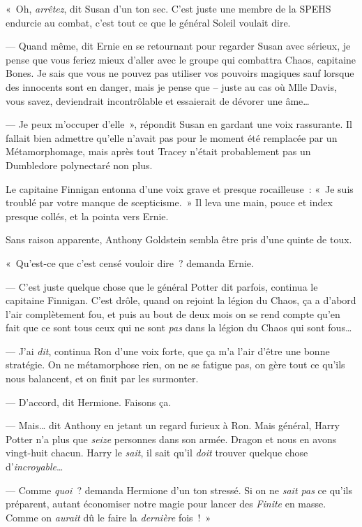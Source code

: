 «~Oh, \emph{arrêtez}, dit Susan d'un ton sec.
C'est juste une membre de la SPEHS endurcie au combat, c'est tout ce que le général Soleil voulait dire.

--- Quand même, dit Ernie en se retournant pour regarder Susan avec sérieux, je pense que vous feriez mieux d'aller avec le groupe qui combattra Chaos, capitaine Bones.
Je sais que vous ne pouvez pas utiliser vos pouvoirs magiques sauf lorsque des innocents sont en danger, mais je pense que -- juste au cas où Mlle Davis, vous savez, deviendrait incontrôlable et essaierait de dévorer une âme…

--- Je peux m'occuper d'elle~», répondit Susan en gardant une voix rassurante.
Il fallait bien admettre qu'elle n'avait pas pour le moment été remplacée par un Métamorphomage, mais après tout Tracey n'était probablement pas un Dumbledore polynectaré non plus.

Le capitaine Finnigan entonna d'une voix grave et presque rocailleuse~: «~Je suis troublé par votre manque de scepticisme.~»
Il leva une main, pouce et index presque collés, et la pointa vers Ernie.

Sans raison apparente, Anthony Goldstein sembla être pris d'une quinte de toux.

«~Qu'est-ce que c'est censé vouloir dire~? demanda Ernie.

--- C'est juste quelque chose que le général Potter dit parfois, continua le capitaine Finnigan.
C'est drôle, quand on rejoint la légion du Chaos, ça a d'abord l'air complètement fou, et puis au bout de deux mois on se rend compte qu'en fait que ce sont tous ceux qui ne sont \emph{pas} dans la légion du Chaos qui sont fous…

--- J'ai \emph{dit}, continua Ron d'une voix forte, que ça m'a l'air d'être une bonne stratégie.
On ne métamorphose rien, on ne se fatigue pas, on gère tout ce qu'ils nous balancent, et on finit par les surmonter.

--- D'accord, dit Hermione.
Faisons ça.

--- Mais… dit Anthony en jetant un regard furieux à Ron.
Mais général, Harry Potter n'a plus que \emph{seize} personnes dans son armée.
Dragon et nous en avons vingt-huit chacun.
Harry le \emph{sait}, il sait qu'il \emph{doit} trouver quelque chose d'\emph{incroyable}…

--- Comme \emph{quoi}~? demanda Hermione d'un ton stressé.
Si on ne \emph{sait pas} ce qu'ils préparent, autant économiser notre magie pour lancer des \emph{Finite} en masse.
Comme on \emph{aurait} dû le faire la \emph{dernière} fois~!~»

